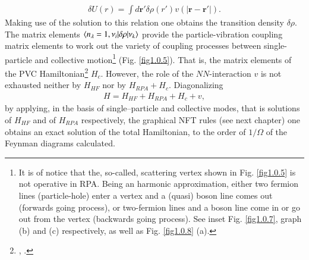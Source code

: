 \begin{align}\label{eq1.0.19}
\delta U(r)=\int d\mathbf r' \delta \rho(r')v\left(|\mathbf r-\mathbf r'|\right).
\end{align}
Making use  of the solution to this relation  one obtains the transition density $\delta\rho$. The matrix elements $\langle {n_\lambda=1, \nu_i|\delta\rho|\nu_k} \rangle$ provide the  particle-vibration coupling matrix elements to work out the variety of coupling processes between single-particle and collective motion\footnote{It is of notice that the, so-called, scattering vertex shown in Fig. \ref{fig1.0.5} is not operative in RPA. Being an harmonic approximation, either two fermion lines (particle-hole) enter a vertex and a (quasi) boson line comes out (forwards going process), or two-fermion lines and a boson line come in or go out from the vertex (backwards going process). See inset Fig. \ref{fig1.0.7}, graph (b) and (c) respectively, as well as Fig. \ref{fig1.0.8} (a).} (Fig. \ref{fig1.0.5}). That is, the matrix elements of the PVC Hamiltonian\footnote{\label{f14C1}\cite{Mottelson:68}, \cite{Mottelson:67,Hamamoto:69,Hamamoto:70,Hamamoto:70b,Hamamoto:77,Bes:71,Broglia:71b,Broglia:71c,Flynn:71}.}  $H_c$. However, the role of the $NN$-interaction $v$ is not exhausted neither by $H_{HF}$ nor by $H_{RPA}+H_c$. Diagonalizing 
\begin{align}\label{eq1.0.19b}
H=H_{HF}+H_{RPA}+H_c+v,
\end{align}
by applying,  in the basis of single--particle and collective modes, that is solutions of $H_{HF}$ and of $H_{RPA}$ respectively, the graphical  NFT rules  (see next chapter) one obtains an exact solution of the total Hamiltonian, to the order of $1/\Omega$ of the Feynman diagrams calculated. 


